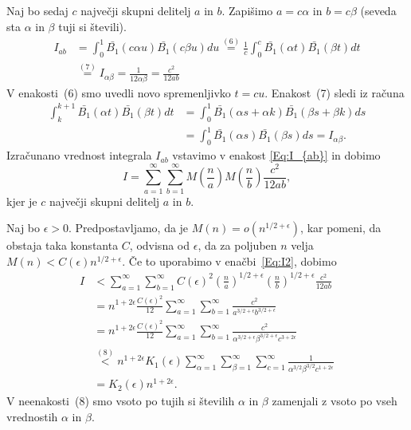 \documentclass[mat1]{fmfdelo}
\begin{document}
Naj bo sedaj $c$ največji skupni delitelj $a$ in $b$. Zapišimo $a = c \alpha$ in $b = c \beta$ (seveda sta $\alpha$ in $\beta$ tuji si števili).
\begin{align}
I_{ab} &= \int_{0}^1 \bar{B_{1}}(c \alpha u) \bar{B_{1}}(c \beta u) du
	\stackrel{(6)}{=} \frac{1}{c} \int_{0}^c \bar{B_{1}}(\alpha t) \bar{B_{1}}(\beta t) dt \nonumber \\
	&\stackrel{(7)}{=} I_{\alpha \beta}
	= \frac{1}{12 \alpha \beta}
	= \frac{c^2}{12ab}
\end{align}
V enakosti~(6) smo uvedli novo spremenljivko $t=cu$.
Enakost~(7) sledi iz računa
\begin{align*}
\int_{k}^{k+1} \bar{B_{1}}(\alpha t) \bar{B_{1}}(\beta t) dt &= \int_{0}^{1} \bar{B_{1}}(\alpha s + \alpha k) \bar{B_{1}}(\beta s + \beta k) ds \\
 	&= \int_{0}^{1} \bar{B_{1}}(\alpha s) \bar{B_{1}}(\beta s) ds = I_{\alpha \beta}.
\end{align*}
%
Izračunano vrednost integrala $I_{ab}$ vstavimo v enakost \eqref{Eq:I_{ab}} in dobimo
\begin{equation}
\label{Eq:I2}
I = \sum_{a=1}^{\infty} \sum_{b=1}^{\infty} M \left(\frac{n}{a} \right) M \left(\frac{n}{b} \right) \frac{c^2}{12ab},
\end{equation}
kjer je $c$ največji skupni delitelj $a$ in $b$.

Naj bo $\epsilon>0$. Predpostavljamo, da je $M(n) = o(n^{1/2+\epsilon})$, kar pomeni, da obstaja taka konstanta $C$, odvisna od $\epsilon$, da za poljuben $n$ velja $M(n) < C(\epsilon) n^{1/2+\epsilon}$. Če to uporabimo v enačbi~\eqref{Eq:I2}, dobimo
\begin{align}
I &< \sum_{a=1}^{\infty} \sum_{b=1}^{\infty} C(\epsilon)^2 \left( \frac{n}{a} \right)^{1/2+\epsilon} \left( \frac{n}{b} \right)^{1/2+\epsilon} \frac{c^2}{12ab} \nonumber \\
  &= n^{1+2\epsilon} \frac{C(\epsilon)^2}{12} \sum_{a=1}^{\infty} \sum_{b=1}^{\infty} \frac{c^2}{a^{3/2+\epsilon} b^{3/2+\epsilon}} \nonumber \\
  &= n^{1+2\epsilon} \frac{C(\epsilon)^2}{12} \sum_{a=1}^{\infty} \sum_{b=1}^{\infty} \frac{c^2}{\alpha^{3/2+\epsilon} \beta^{3/2+\epsilon} c^{3+2\epsilon}} \nonumber \\
  &\stackrel{(8)}{<} n^{1+2\epsilon} K_{1}(\epsilon) \sum_{\alpha=1}^{\infty} \sum_{\beta=1}^{\infty} \sum_{c=1}^{\infty} \frac{1}{\alpha^{3/2} \beta^{3/2} c^{1+2\epsilon}} \nonumber \\
  &= K_{2}(\epsilon) n^{1+2\epsilon}.
\end{align}
V neenakosti~(8) smo vsoto po tujih si številih $\alpha$ in $\beta$ zamenjali z vsoto po vseh vrednostih $\alpha$ in $\beta$.
\end{document}
